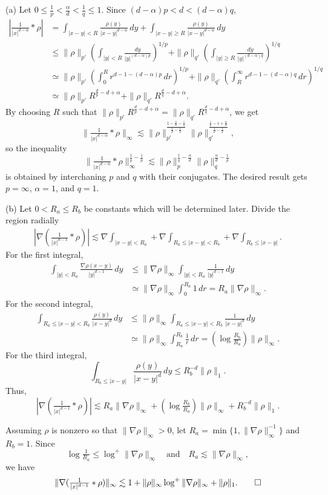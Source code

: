 \documentclass[12pt]{article}
\begin{document}
\begin{pf}
(a)
Let $0\le\frac1p<\frac\alpha d<\frac1q\le1$.
Since $(d-\alpha)p<d<(d-\alpha)q$,
\begin{align*}
|\tfrac1{|x|^{d-\alpha}}*\rho|
&=\int_{|x-y|<R}\frac{\rho(y)}{|x-y|^{d-\alpha}}\,dy+\int_{|x-y|\ge R}\frac{\rho(y)}{|x-y|^{d-\alpha}}\,dy\\
&\le\|\rho\|_{p'}(\int_{|y|<R}\frac{dy}{|y|^{(d-\alpha)p}})^{1/p}+\|\rho\|_{q'}(\int_{|y|\ge R}\frac{dy}{|y|^{(d-\alpha)q}})^{1/q}\\
&\simeq\|\rho\|_{p'}(\int_0^Rr^{d-1-(d-\alpha)p}\,dr)^{1/p}+\|\rho\|_{q'}(\int_R^\infty r^{d-1-(d-\alpha)q}\,dr)^{1/q}\\
&\simeq\|\rho\|_{p'}R^{\frac dp-d+\alpha}+\|\rho\|_{q'}R^{\frac dq-d+\alpha}.
\end{align*}
By choosing $R$ such that $\|\rho\|_{p'}R^{\frac dp-d+\alpha}=\|\rho\|_{q'}R^{\frac dq-d+\alpha}$, we get
\[\|\tfrac1{|x|^{d-\alpha}}*\rho\|_\infty\lesssim\|\rho\|_{p'}^{\frac{1-\frac\alpha d-\frac1q}{\frac1p-\frac1q}}\|\rho\|_{q'}^{\frac{\frac1p-1+\frac\alpha d}{\frac1p-\frac1q}},\]
so the inequality
\[\|\tfrac1{|x|^{d-\alpha}}*\rho\|_\infty^{\frac1q-\frac1p}\lesssim\|\rho\|_p^{\frac1q-\frac\alpha d}\|\rho\|_q^{\frac\alpha d-\frac1p}\]
is obtained by interchaning $p$ and $q$ with their conjugates.
The desired result gets $p=\infty$, $\alpha=1$, and $q=1$.

(b)
Let $0<R_a\le R_b$ be constants which will be determined later.
Divide the region radially
\begin{align*}
|\nabla(\tfrac1{|x|^{d-1}}*\rho)|\lesssim\nabla\int_{|x-y|<R_a}+\nabla\int_{R_a\le|x-y|<R_b}+\nabla\int_{R_b\le|x-y|}.
\end{align*}
For the first integral,
\begin{align*}
\int_{|y|<R_a}\frac{\nabla\rho(x-y)}{|y|^{d-1}}\,dy
&\le\|\nabla\rho\|_\infty\int_{|y|<R_a}\frac1{|y|^{d-1}}\,dy\\
&\simeq\|\nabla\rho\|_\infty\int_0^{R_a}1\,dr
=R_a\|\nabla\rho\|_\infty.
\end{align*}
For the second integral,
\begin{align*}
\int_{R_a\le|x-y|<R_b}\frac{\rho(y)}{|x-y|^d}\,dy
&\le\|\rho\|_\infty\int_{R_a\le|x-y|<R_b}\frac1{|x-y|^d}\,dy\\
&\simeq\|\rho\|_\infty\int_{R_a}^{R_b}\frac1r\,dr
=(\log\tfrac{R_b}{R_a})\|\rho\|_\infty.
\end{align*}
For the third integral,
\[\int_{R_b\le|x-y|}\frac{\rho(y)}{|x-y|^d}\,dy\le R_b^{-d}\|\rho\|_1.\]
Thus,
\[|\nabla(\tfrac1{|x|^{d-1}}*\rho)|\lesssim R_a\|\nabla\rho\|_\infty+(\log\tfrac{R_b}{R_a})\|\rho\|_\infty+R_b^{-d}\|\rho\|_1.\]

Assuming $\rho$ is nonzero so that $\|\nabla\rho\|_\infty>0$, let $R_a=\min\{1,\|\nabla\rho\|_\infty^{-1}\}$ and $R_b=1$.
Since
\[\log\tfrac1{R_a}\le\log^+\|\nabla\rho\|_\infty\quad\text{and}\quad R_a\lesssim\|\nabla\rho\|_\infty,\]
we have
\[\|\nabla(\tfrac1{|x|^{d-1}}*\rho)\|_\infty\lesssim1+\|\rho\|_\infty\log^+\|\nabla\rho\|_\infty+\|\rho\|_1.\qedhere\]
\end{pf}
\end{document}
